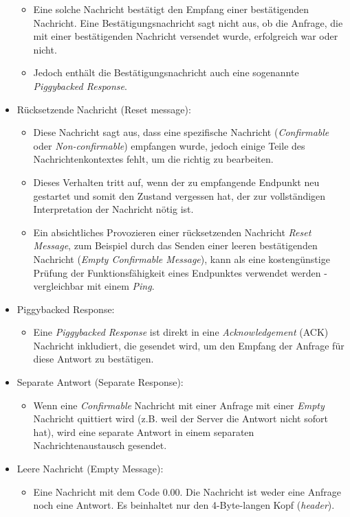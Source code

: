 \begin{itemize}
\begin{itemize}
              \item Eine solche Nachricht bestätigt den Empfang einer bestätigenden Nachricht. Eine Bestätigungsnachricht sagt nicht aus, ob die Anfrage, die mit einer bestätigenden Nachricht versendet wurde, erfolgreich war oder nicht.
              \item Jedoch enthält die Bestätigungsnachricht auch eine sogenannte \textit{Piggybacked Response}.
          \end{itemize}
    \item Rücksetzende Nachricht (Reset message):
          \begin{itemize}
              \item Diese Nachricht sagt aus, dass eine spezifische Nachricht (\textit{Confirmable} oder \textit{Non-confirmable}) empfangen wurde, jedoch einige Teile des Nachrichtenkontextes fehlt, um die richtig zu bearbeiten.
              \item Dieses Verhalten tritt auf, wenn der zu empfangende Endpunkt neu gestartet und somit den Zustand vergessen hat, der zur vollständigen Interpretation der Nachricht nötig ist.
              \item Ein absichtliches Provozieren einer rücksetzenden Nachricht \textit{Reset Message}, zum Beispiel durch das Senden einer leeren bestätigenden Nachricht (\textit{Empty Confirmable Message}), kann als eine kostengünstige Prüfung der Funktionsfähigkeit eines Endpunktes verwendet werden - vergleichbar mit einem \textit{Ping}.
          \end{itemize}
    \item Piggybacked Response:
          \begin{itemize}
              \item Eine \textit{Piggybacked Response} ist direkt in eine \textit{Acknowledgement} (ACK) Nachricht inkludiert, die gesendet wird, um den Empfang der Anfrage für diese Antwort zu bestätigen.
          \end{itemize}
    \item Separate Antwort (Separate Response):
          \begin{itemize}
              \item Wenn eine \textit{Confirmable} Nachricht mit einer Anfrage mit einer \textit{Empty} Nachricht quittiert wird (z.B. weil der Server die Antwort nicht sofort hat), wird eine separate Antwort in einem separaten Nachrichtenaustausch gesendet.
          \end{itemize}
    \item Leere Nachricht (Empty Message):
          \begin{itemize}
              \item Eine Nachricht mit dem Code 0.00. Die Nachricht ist weder eine Anfrage noch eine Antwort. Es beinhaltet nur den 4-Byte-langen Kopf (\textit{header}).
          \end{itemize}
\end{itemize}

